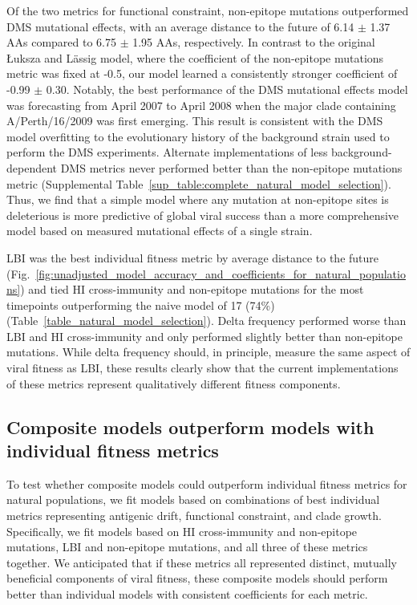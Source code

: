 Of the two metrics for functional constraint, non-epitope mutations outperformed DMS mutational effects, with an average distance to the future of 6.14 $\pm$ 1.37 AAs compared to 6.75 $\pm$ 1.95 AAs, respectively.
In contrast to the original {\L}uksza and L\"assig \cite{Luksza:2014hj} model, where the coefficient of the non-epitope mutations metric was fixed at -0.5, our model learned a consistently stronger coefficient of -0.99 $\pm$ 0.30.
Notably, the best performance of the DMS mutational effects model was forecasting from April 2007 to April 2008 when the major clade containing A/Perth/16/2009 was first emerging.
This result is consistent with the DMS model overfitting to the evolutionary history of the background strain used to perform the DMS experiments.
Alternate implementations of less background-dependent DMS metrics never performed better than the non-epitope mutations metric (Supplemental Table~\ref{sup_table:complete_natural_model_selection}).
Thus, we find that a simple model where any mutation at non-epitope sites is deleterious is more predictive of global viral success than a more comprehensive model based on measured mutational effects of a single strain.

LBI was the best individual fitness metric by average distance to the future (Fig.~\ref{fig:unadjusted_model_accuracy_and_coefficients_for_natural_populations}) and tied HI cross-immunity and non-epitope mutations for the most timepoints outperforming the naive model of 17 (74\%) (Table~\ref{table_natural_model_selection}).
Delta frequency performed worse than LBI and HI cross-immunity and only performed slightly better than non-epitope mutations.
While delta frequency should, in principle, measure the same aspect of viral fitness as LBI, these results clearly show that the current implementations of these metrics represent qualitatively different fitness components.

\subsection*{Composite models outperform models with individual fitness metrics}

To test whether composite models could outperform individual fitness metrics for natural populations, we fit models based on combinations of best individual metrics representing antigenic drift, functional constraint, and clade growth.
Specifically, we fit models based on HI cross-immunity and non-epitope mutations, LBI and non-epitope mutations, and all three of these metrics together.
We anticipated that if these metrics all represented distinct, mutually beneficial components of viral fitness, these composite models should perform better than individual models with consistent coefficients for each metric.

